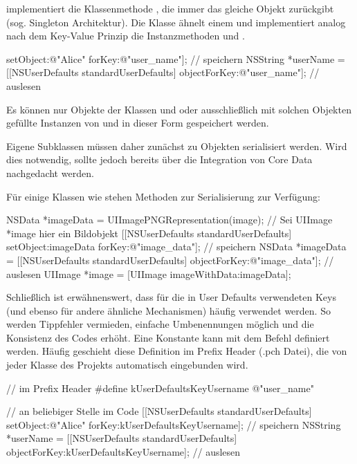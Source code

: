 \documentclass[parskip=half, final]{scrreprt}
\begin{document}
 implementiert die Klassenmethode , die immer das gleiche Objekt zurückgibt (sog. Singleton Architektur). Die Klasse ähnelt einem  und implementiert analog nach dem Key-Value Prinzip die Instanzmethoden  und .

\begin{objclst}
[[NSUserDefaults standardUserDefaults] setObject:@"Alice" forKey:@"user_name"]; // speichern
NSString *userName = [[NSUserDefaults standardUserDefaults] objectForKey:@"user_name"]; // auslesen
\end{objclst}

Es können nur Objekte der Klassen  und  oder ausschließlich mit solchen Objekten gefüllte Instanzen von  und  in dieser Form gespeichert werden.

Eigene Subklassen müssen daher zunächst zu  Objekten serialisiert werden. Wird dies notwendig, sollte jedoch bereits über die Integration von Core Data nachgedacht werden.

Für einige Klassen wie  stehen Methoden zur Serialisierung zur Verfügung:

\begin{objclst}
NSData *imageData = UIImagePNGRepresentation(image); // Sei UIImage *image hier ein Bildobjekt
[[NSUserDefaults standardUserDefaults] setObject:imageData forKey:@"image_data"]; // speichern
NSData *imageData = [[NSUserDefaults standardUserDefaults] objectForKey:@"image_data"]; // auslesen
UIImage *image = [UIImage imageWithData:imageData];
\end{objclst}

Schließlich ist erwähnenswert, dass für die in User Defaults verwendeten Keys (und ebenso für andere ähnliche Mechanismen) häufig  verwendet werden. So werden Tippfehler vermieden, einfache Umbenennungen möglich und die Konsistenz des Codes erhöht. Eine Konstante kann mit dem Befehl  definiert werden. Häufig geschieht diese Definition im Prefix Header (.pch Datei), die von jeder Klasse des Projekts automatisch eingebunden wird.

\begin{objclst}
// im Prefix Header
#define kUserDefaultsKeyUsername @"user_name"

// an beliebiger Stelle im Code
[[NSUserDefaults standardUserDefaults] setObject:@"Alice" forKey:kUserDefaultsKeyUsername]; // speichern
NSString *userName = [[NSUserDefaults standardUserDefaults] objectForKey:kUserDefaultsKeyUsername]; // auslesen
\end{objclst}
\end{document}
